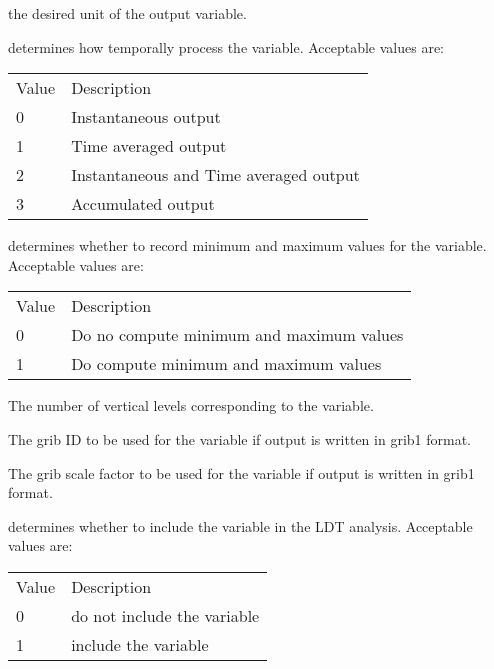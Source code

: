   the desired unit of the output variable.
 \nextpar

  determines how temporally process the 
 variable.
 Acceptable values are: 
 \nextpar
 \begin{tabular}{ll}
 Value & Description            \\
  0 & Instantaneous output \\
  1 & Time averaged output      \\
  2 & Instantaneous and Time averaged output      \\
  3 & Accumulated output      \\
 \end{tabular}
 \nextpar

  determines whether to record minimum and
 maximum values for the variable.
 Acceptable values are: 
 \nextpar
 \begin{tabular}{ll}
 Value & Description            \\
  0 & Do no compute minimum and maximum values \\
  1 & Do compute minimum and maximum values      \\
 \end{tabular}
 \nextpar

  The number of vertical levels 
 corresponding to the variable. 
 \nextpar

  The grib ID to be used for the variable if output
 is written in grib1 format. 
 \nextpar
 
  The grib scale factor to be used for the 
 variable if output is written in grib1 format. 
 \nextpar
 
  determines whether to include the variable
 in the LDT analysis. 
 Acceptable values are: 
 \nextpar
 \begin{tabular}{ll}
 Value & Description            \\
  0 & do not include the variable \\
  1 & include the variable        \\
 \end{tabular}
 \nextpar

 \nextpar
 
